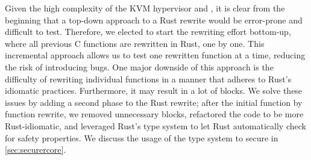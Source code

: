 %

Given the high complexity of the KVM hypervisor and \secore{},
it is clear from the beginning that
a top-down approach to a Rust rewrite would be error-prone and difficult to test.
Therefore, we elected to start the rewriting effort bottom-up,
where all previous C functions are rewritten in Rust, one by one.
This incremental approach allows us to test one rewritten function at a time,
reducing the risk of introducing bugs.
One major downside of this approach is the difficulty of rewriting individual
functions in a manner that adheres to Rust's idiomatic practices.
Furthermore, it may result in a lot of  blocks.
We solve these issues by adding a second phase to the Rust rewrite;
after the initial function by function rewrite, we removed unnecessary
 blocks, refactored the code to be more Rust-idiomatic,
and leveraged Rust's type system to let Rust automatically check for safety
properties.
We discuss the usage of the type system to secure \rustcore{} in
\autoref{sec:securercore}.

